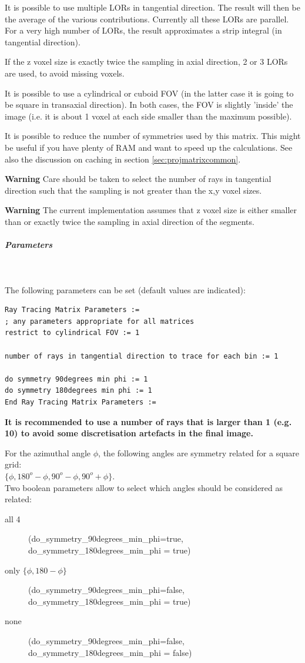 \documentclass{article}
\newcommand{\subsubsubsubsection}[1]{\subparagraph{#1} \mbox{} \\}
\begin{document}
{{It is possible to use multiple LORs in tangential direction. 
The result will then be the average of the various contributions. 
Currently all these LORs are parallel. For a very high number 
of LORs, the result approximates a strip integral (in tangential 
direction).

If the z voxel size is exactly twice the sampling in axial direction, 
2 or 3 LORs are used, to avoid missing voxels. 

It is possible to use a cylindrical or cuboid FOV (in the latter 
case it is going to be square in transaxial direction). In both 
cases, the FOV is slightly 'inside' the image (i.e. it is about 
1 voxel at each side smaller than the maximum possible).

It is possible to reduce the number of symmetries used by this 
matrix. This might be useful if you have plenty of RAM and want 
to speed up the calculations. See also the discussion on caching 
in section \ref{sec:projmatrixcommon}.

\textbf{Warning} Care should be taken to select the number of rays 
in tangential direction such that the sampling is not greater 
than the x,y voxel sizes.

\textbf{Warning} The current implementation assumes that z voxel size 
is either smaller than or exactly twice the sampling in axial 
direction of the segments.

{ \subsubsubsubsection{Parameters}
}
The following parameters can be set (default values are indicated):
\begin{verbatim}
Ray Tracing Matrix Parameters := 
; any parameters appropriate for all matrices
restrict to cylindrical FOV := 1

number of rays in tangential direction to trace for each bin := 1

do symmetry 90degrees min phi := 1 
do symmetry 180degrees min phi := 1
End Ray Tracing Matrix Parameters :=
\end{verbatim}

\textbf{It is recommended to use a number of rays that is larger than 1 (e.g. 10) to
avoid some discretisation artefacts in the final image.}

For the azimuthal angle $\phi$, the following angles are symmetry 
related for a square grid: \\
$\{\phi, 180^{o}-\phi, 90^{o}-\phi, 90^{o}+\phi\}$.\\
Two boolean parameters allow to select which angles should be 
considered as related:
\begin{description}
\item[all 4]
  (do\_symmetry\_90degrees\_min\_phi=true,  \\
do\_symmetry\_180degrees\_min\_phi = true)
\item[only $\{ \phi, 180- \phi \}$]
(do\_symmetry\_90degrees\_min\_phi=false,  \\
do\_symmetry\_180degrees\_min\_phi = true)
\item[none]
(do\_symmetry\_90degrees\_min\_phi=false, \\
do\_symmetry\_180degrees\_min\_phi = false)
\end{description}

}}
\end{document}
